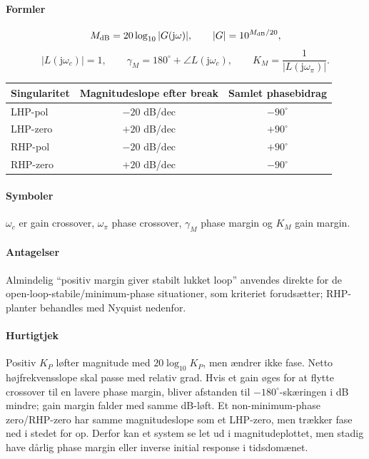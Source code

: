 \paragraph{Formler}
\begin{equation}
\label{eq:bode-db-conversion}
M_{\mathrm{dB}}=20\log_{10}|G(\mathrm{j}\omega)|,\qquad
|G|=10^{M_{\mathrm{dB}}/20},
\end{equation}
\begin{equation}
\label{eq:bode-margins}
|L(\mathrm{j}\omega_c)|=1,\qquad
\gamma_M=180^\circ+\angle L(\mathrm{j}\omega_c),\qquad
K_M=\frac1{|L(\mathrm{j}\omega_\pi)|}.
\end{equation}
\begin{center}
\begin{tabular}{@{}lcc@{}}
\toprule
Singularitet & Magnitudeslope efter break & Samlet phasebidrag\\
\midrule
LHP-pol & \(-20\) dB/dec & \(-90^\circ\)\\
LHP-zero & \(+20\) dB/dec & \(+90^\circ\)\\
RHP-pol & \(-20\) dB/dec & \(+90^\circ\)\\
RHP-zero & \(+20\) dB/dec & \(-90^\circ\)\\
\bottomrule
\end{tabular}
\end{center}

\paragraph{Symboler}
\(\omega_c\) er gain crossover, \(\omega_\pi\) phase crossover,
\(\gamma_M\) phase margin og \(K_M\) gain margin.

\paragraph{Antagelser}
Almindelig ``positiv margin giver stabilt lukket loop'' anvendes direkte for de
open-loop-stabile/minimum-phase situationer, som kriteriet forudsætter; RHP-planter
behandles med Nyquist nedenfor.

\paragraph{Hurtigtjek}
Positiv \(K_P\) løfter magnitude med \(20\log_{10}K_P\), men ændrer ikke fase.
Netto højfrekvensslope skal passe med relativ grad.
Hvis et gain øges for at flytte crossover til en lavere phase margin, bliver afstanden
til \(-180^\circ\)-skæringen i dB mindre; gain margin falder med samme dB-løft.
Et non-minimum-phase zero/RHP-zero har samme magnitudeslope som et LHP-zero, men trækker
fase ned i stedet for op. Derfor kan et system se let ud i magnitudeplottet, men stadig
have dårlig phase margin eller inverse initial response i tidsdomænet.

